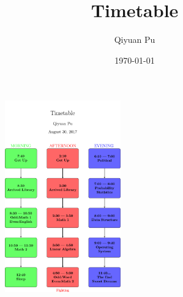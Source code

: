 \documentclass{article}
\begin{document}
\title{Timetable}
\author{Qiyuan Pu}
\date{\today{}}
\maketitle{}

\begin{figure}[	]
  \centering
  \includegraphics[width=5cm]{timetable}
\end{figure}
\end{document}
